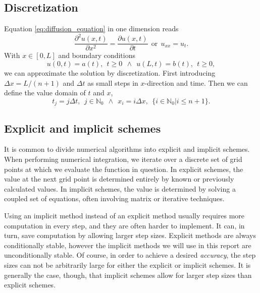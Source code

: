 \documentclass[reprint, english,notitlepage,nofootinbib]{revtex4-1}  %
\begin{document}
\subsection*{Discretization}

Equation \eqref{eq:diffusion_equation} in one dimension reads
\begin{equation}
\label{eq:diffusion_equation_1D}
\frac{\partial^2u(x, t)}{\partial x^2} = \frac{\partial u(x,t)}{\partial t} \ \ \text{or} \ \ u_{xx} = u_t.
\end{equation}
With $x\in[0,L]$ and boundary conditions
\begin{equation*}
\label{eq:boundary_conditions}
u(0, t) = a(t), \ \ t\geq 0 \ \ \wedge \ \ u(L,t) = b(t), \ \ t\geq 0,
\end{equation*}
we can approximate the solution by discretization. First introducing $\Delta x = L/(n+1)$ and $\Delta t$ as small steps in $x$-direction and time. Then we can define the value domain of $t$ and $x$,
\begin{equation*}
t_j = j\Delta t, \ \ j\in \mathbb{N}_0 \ \ \wedge \ \ x_i = i\Delta x, \ \ \{i \in \mathbb{N}_0 | i \leq n + 1\}.
\end{equation*}

\subsection*{Explicit and implicit schemes}

It is common to divide numerical algorithms into explicit and implicit schemes. When performing numerical integration, we iterate over a discrete set of grid points at which we evaluate the function in question. In explicit schemes, the value at the next grid point is determined entirely by known or previously calculated values. In implicit schemes, the value is determined by solving a coupled set of equations, often involving matrix or iterative techniques.

Using an implicit method instead of an explicit method usually requires more computation in every step, and they are often harder to implement. It can, in turn, save computation by allowing larger step sizes. Explicit methods are always conditionally stable, however the implicit methods we will use in this report are unconditionally stable. Of course, in order to achieve a desired \textit{accuracy}, the step sizes can not be arbitrarily large for either the explicit or implicit schemes. It is generally the case, though, that implicit schemes allow for larger step sizes than explicit schemes.
\end{document}
